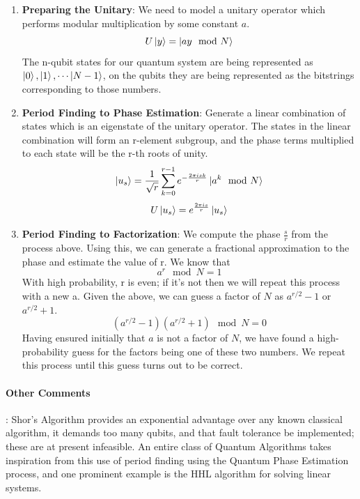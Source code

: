 \begin{enumerate}
    \item \textbf{Preparing the Unitary}: We need to model a unitary operator which performs modular multiplication by some constant $a$.
    \begin{equation}
        U \ket{y} = \ket{ay \mod N}
    \end{equation}
    The n-qubit states for our quantum system are being represented as $\ket{0}, \ket{1}, \cdots \ket{N - 1}$, on the qubits they are being represented as the bitstrings corresponding to those numbers.
    \item \textbf{Period Finding to Phase Estimation}: Generate a linear combination of states which is an eigenstate of the unitary operator. The states in the linear combination will form an r-element subgroup, and the phase terms multiplied to each state will be the r-th roots of unity.
    \begin{equation}
        \ket{u_s} = \frac{1}{\sqrt{r}} \sum_{k=0}^{r-1} e^{-\frac{2\pi i s k}{r}} \ket{a^k \mod N}
    \end{equation}
    \begin{equation}
        U \ket{u_s} = e^{\frac{2 \pi i s}{r}} \ket{u_s}
    \end{equation}
    \item \textbf{Period Finding to Factorization}: We compute the phase $\frac{s}{r}$ from the process above. Using this, we can generate a fractional approximation to the phase and estimate the value of r. We know that
    \begin{equation}
        a^r \mod N = 1
    \end{equation}
    With high probability, r is even; if it's not then we will repeat this process with a new a. Given the above, we can guess a factor of $N$ as $a^{r/2} - 1$ or $a^{r/2} + 1$.
    \begin{equation}
        (a^{r/2} - 1) (a^{r/2} + 1) \mod N = 0
    \end{equation}
    Having ensured initially that $a$ is not a factor of $N$, we have found a high-probability guess for the factors being one of these two numbers. We repeat this process until this guess turns out to be correct.
\end{enumerate}

\paragraph*{Other Comments}: Shor's Algorithm provides an exponential advantage over any known classical algorithm, it demands too many qubits, and that fault tolerance be implemented; these are at present infeasible. An entire class of Quantum Algorithms takes inspiration from this use of period finding using the Quantum Phase Estimation process, and one prominent example is the HHL algorithm \cite{quantum-algo-hhl} for solving linear systems.

